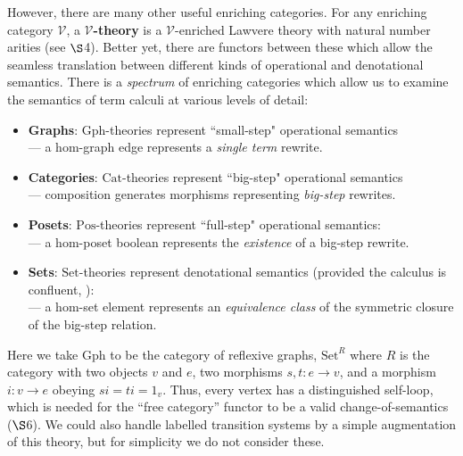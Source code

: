 \documentclass{amsart}
\theoremstyle{definition}
\newcommand{\Gph}{\mathrm{Gph}}
\newcommand{\Set}{\mathrm{Set}}
\newcommand{\Cat}{\mathrm{Cat}}
\newcommand{\Pos}{\mathrm{Pos}}
\newcommand{\V}{\mathscr{V}}
\newcommand{\maps}{\colon}
\begin{document}
However, there are many other useful enriching categories.  For any enriching category $\V$, a \textbf{$\V$-theory} is a $\V$-enriched Lawvere theory with natural number arities (see $\S$4). Better yet, there are functors between these which allow the seamless translation between different kinds of operational and denotational semantics.  There is a \textit{spectrum} of enriching categories which allow us to examine the semantics of term calculi at various levels of detail:

\begin{itemize}
\item 
\textbf{Graphs}: $\Gph$-theories represent ``small-step" operational semantics \\ --- a hom-graph edge represents a \textit{single term} rewrite.
\item
\textbf{Categories}: $\Cat$-theories represent ``big-step" operational semantics\\ --- composition 
generates morphisms representing \textit{big-step} rewrites.
\item
\textbf{Posets}: $\Pos$-theories represent ``full-step" operational semantics:\\ --- a hom-poset boolean represents the \textit{existence} of a big-step rewrite.
\item
\textbf{Sets}: $\Set$-theories represent denotational semantics (provided the calculus is confluent, \cite{lam}):\\ --- a hom-set element represents an \textit{equivalence class} of the symmetric closure of the big-step relation.
\end{itemize}
Here we take $\Gph$ to be the category of reflexive graphs, $\Set^R$ where $R$ is the category with two objects $v$ and $e$, two morphisms $s,t \maps e \to v$, and a morphism $i \maps v \to e$ obeying $si = ti = 1_v$.  Thus, every vertex has a distinguished self-loop, which is needed for the ``free category'' functor to be a valid change-of-semantics ($\S$6).   We could also handle labelled transition systems by a simple augmentation of this theory, but for simplicity we do not consider these.

\end{document}
